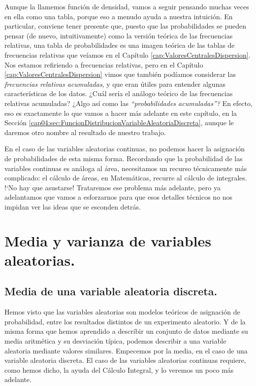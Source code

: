 Aunque la llamemos función de densidad, vamos a seguir pensando muchas veces en ella como una tabla, porque eso a menudo ayuda a nuestra intuición. En particular, conviene tener presente que, puesto que las probabilidades se pueden pensar (de nuevo, intuitivamente) como la versión teórica de las frecuencias relativas, una tabla de probabilidades es una imagen teórica de las tablas de frecuencias relativas que veíamos en el Capítulo \ref{cap:ValoresCentralesDispersion}. Nos estamos refiriendo a frecuencias relativas, pero en el Capítulo \ref{cap:ValoresCentralesDispersion} vimos que también podíamos considerar las {\em frecuencias relativas acumuladas}, y que eran útiles para entender algunas características de los datos. ¿Cuál sería el análogo teórico de las frecuencias relativas acumuladas? ¿Algo así como las {\em ``probabilidades acumuladas''?} En efecto, eso es exactamente lo que vamos a hacer más adelante en este capítulo, en la Sección \ref{cap04:sec:FuncionDistribucionVariableAleatoriaDiscreta}, aunque le daremos otro nombre al resultado de nuestro trabajo.

En el caso de las variables aleatorias continuas, no podemos hacer la asignación de probabilidades de esta misma forma. Recordando que la probabilidad de las variables continuas es análoga al área, necesitamos un recurso técnicamente más complicado: el cálculo de áreas, en Matemáticas, recurre al cálculo de integrales. {!`}No hay que asustarse! Trataremos ese problema más adelante, pero ya  adelantamos que vamos a esforzarnos para que esos detalles técnicos no nos impidan ver las ideas que se esconden detrás.


\section{Media y varianza de variables aleatorias.}\label{cap04:sec:MediaVarianzaVariablesAleatorias}


\subsection{Media de una variable aleatoria discreta.}
\label{cap04:subsec:MediaVariableAleatroriaDiscreta}

Hemos visto que las variables aleatorias son modelos teóricos de asignación de probabilidad, entre los resultados distintos de un experimento aleatorio. Y de la misma forma que hemos aprendido a describir un conjunto de datos mediante su media aritmética y su desviación típica, podemos
describir a una variable aleatoria mediante valores similares. Empecemos por la media, en el caso de una variable aleatoria discreta. El caso de las variables aleatorias continuas requiere, como hemos dicho, la ayuda del Cálculo Integral, y lo veremos un poco más adelante.

